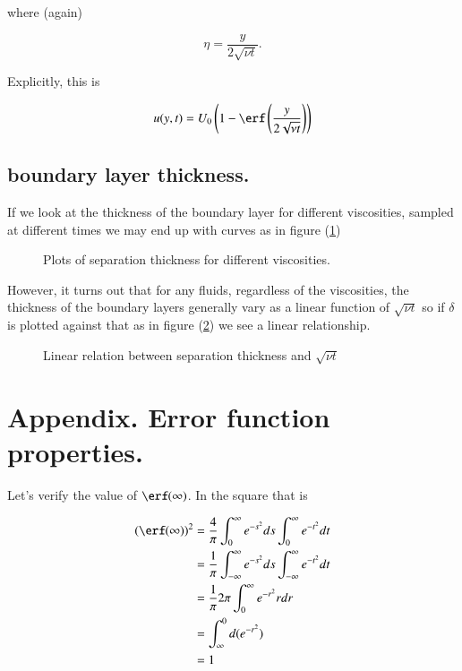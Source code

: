 where (again)

\begin{equation}\label{eqn:continuumL16:610}
\eta = \frac{y}{2 \sqrt{\nu t}}.
\end{equation}

Explicitly, this is

\begin{equation}\label{eqn:continuumL16:590b}
u(y, t) = U_0 \left(1 - \erf\left(\frac{y}{2 \sqrt{\nu t}}\right) \right)
\end{equation}

\subsection{boundary layer thickness.}

If we look at the thickness of the boundary layer for different viscosities, sampled at different times we may end up with curves as in figure (\ref{fig:continuumL16:continuumL16Fig4a})

\begin{figure}[htp]
   \centering
   \def\svgwidth{0.3\columnwidth}
   
   \caption{Plots of separation thickness for different viscosities.}\label{fig:continuumL16:continuumL16Fig4a}
\end{figure}

However, it turns out that for any fluids, regardless of the viscosities, the thickness of the boundary layers generally vary as a linear function of $\sqrt{\nu t}$ so if $\delta$ is plotted against that as in figure (\ref{fig:continuumL16:continuumL16Fig4b}) we see a linear relationship.

\begin{figure}[htp]
   \centering
   \def\svgwidth{0.3\columnwidth}
   
   \caption{Linear relation between separation thickness and $\sqrt{\nu t}$}\label{fig:continuumL16:continuumL16Fig4b}
\end{figure}

\section{Appendix.  Error function properties.}

Let's verify the value of $\erf(\infty)$.  In the square that is

\begin{align*}
(\erf(\infty))^2 
&=
\frac{4}{\pi} 
\int_0^\infty e^{-s^2} ds
\int_0^\infty e^{-t^2} dt \\
&=
\frac{1}{\pi} 
\int_{-\infty}^\infty e^{-s^2} ds
\int_{-\infty}^\infty e^{-t^2} dt \\
&=
\frac{1}{\pi} 2 \pi
\int_{0}^\infty e^{-r^2} r dr \\
&=
\int_\infty^0 d( e^{-r^2} ) \\
&= 1
\end{align*}

\EndArticle
